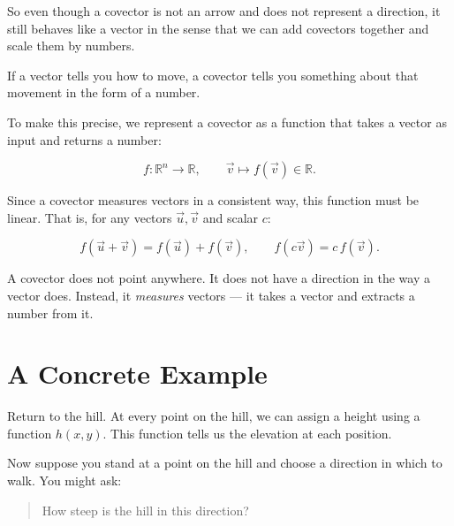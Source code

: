 \documentclass[11pt,openany]{book}
\theoremstyle{definition}
\begin{document}
\medskip

So even though a covector is not an arrow and does not represent a direction, it still
behaves like a vector in the sense that we can add covectors together and scale them
by numbers.

\medskip

\begin{keyidea}
If a vector tells you how to move, a covector tells you something about that movement in the form of a number.
\end{keyidea}

To make this precise, we represent a covector as a function that takes a vector as input
and returns a number:

\[
f: \mathbb{R}^n \to \mathbb{R}, \qquad \vec{v} \mapsto f(\vec{v}) \in \mathbb{R}.
\]

\medskip

Since a covector measures vectors in a consistent way, this function must be linear.
That is, for any vectors $\vec{u}, \vec{v}$ and scalar $c$:

\[
f(\vec{u} + \vec{v}) = f(\vec{u}) + f(\vec{v}), \qquad
f(c\vec{v}) = c\,f(\vec{v}).
\]

A covector does not point anywhere. It does not have a direction in the way a vector
does. Instead, it \textit{measures} vectors --- it takes a vector and extracts a
number from it.

\section{A Concrete Example}

Return to the hill. At every point on the hill, we can assign a height using a function
$h(x, y)$. This function tells us the elevation at each position.

\medskip

Now suppose you stand at a point on the hill and choose a direction in which to walk.
You might ask:

\begin{quote}
How steep is the hill in this direction?
\end{quote}

\medskip
\end{document}
